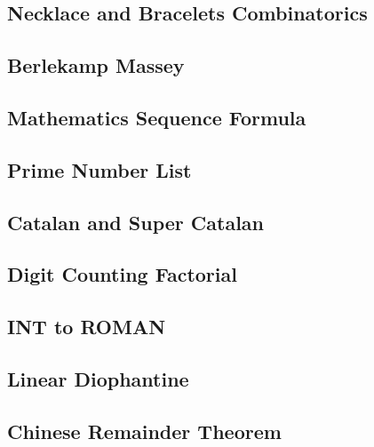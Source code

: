 \subsection{Necklace and Bracelets Combinatorics}


\subsection{Berlekamp Massey}


\subsection{Mathematics Sequence Formula}


\subsection{Prime Number List}


\subsection{Catalan and Super Catalan}


\subsection{Digit Counting Factorial}


\subsection{INT to ROMAN}


\subsection{Linear Diophantine}



\subsection{Chinese Remainder Theorem}




